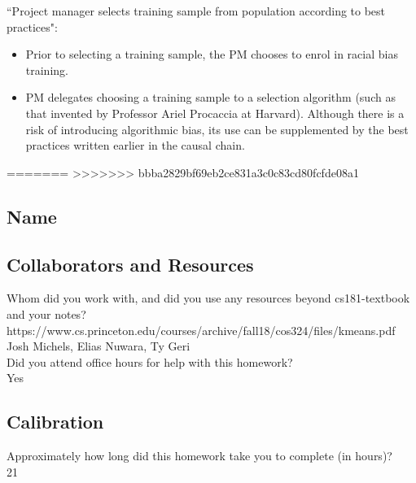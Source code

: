 \documentclass[submit]{harvardml}
\begin{document}
``Project manager selects training sample from population according to best practices":
\begin{itemize}
    \item Prior to selecting a training sample, the PM chooses to enrol in racial bias training.
    \item PM delegates choosing a training sample to a selection algorithm (such as that invented by Professor Ariel Procaccia at Harvard). Although there is a risk of introducing algorithmic bias, its use can be supplemented by the best practices written earlier in the causal chain.
\end{itemize}

=======
>>>>>>> bbba2829bf69eb2ce831a3c0c83cd80fcfde08a1
\newpage
\subsection*{Name}
\subsection*{Collaborators and Resources}
Whom did you work with, and did you use any resources beyond cs181-textbook and your notes?\\
https://www.cs.princeton.edu/courses/archive/fall18/cos324/files/kmeans.pdf\\
Josh Michels, Elias Nuwara, Ty Geri\\

Did you attend office hours for help with this homework?\\
Yes

\subsection*{Calibration}
Approximately how long did this homework take you to complete (in hours)?\\
21
\end{document}
